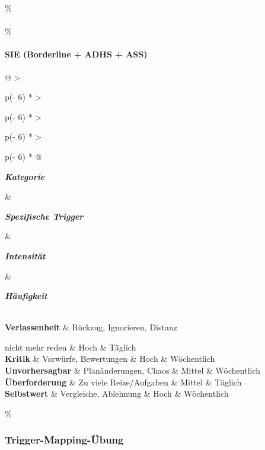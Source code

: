\hypertarget{section}{\%
\paragraph{}\label{section}}

\hypertarget{sie-borderline-adhs-ass}{\%
\paragraph{\texorpdfstring{\textbf{SIE (Borderline + ADHS + ASS)}}{SIE (Borderline + ADHS + ASS)}}\label{sie-borderline-adhs-ass}}

\begin{longtable}[]{@{}
  >{\raggedright\arraybackslash}p{(\columnwidth - 6\tabcolsep) * }
  >{\raggedright\arraybackslash}p{(\columnwidth - 6\tabcolsep) * }
  >{\raggedright\arraybackslash}p{(\columnwidth - 6\tabcolsep) * }
  >{\raggedright\arraybackslash}p{(\columnwidth - 6\tabcolsep) * }@{}}
\toprule\noalign{}
\begin{minipage}[b]{\linewidth}\raggedright
\emph{\textbf{Kategorie}}
\end{minipage} \& \begin{minipage}[b]{\linewidth}\raggedright
\emph{\textbf{Spezifische Trigger}}
\end{minipage} \& \begin{minipage}[b]{\linewidth}\raggedright
\emph{\textbf{Intensität}}
\end{minipage} \& \begin{minipage}[b]{\linewidth}\raggedright
\emph{\textbf{Häufigkeit}}
\end{minipage} \\
\midrule\noalign{}
\endhead
\bottomrule\noalign{}
\endlastfoot
\textbf{Verlassenheit} \& Rückzug, Ignorieren, Distanz

nicht mehr reden \& Hoch \& Täglich \\
\textbf{Kritik} \& Vorwürfe, Bewertungen \& Hoch \& Wöchentlich \\
\textbf{Unvorhersagbar} \& Planänderungen, Chaos \& Mittel \& Wöchentlich \\
\textbf{Überforderung} \& Zu viele Reize/Aufgaben \& Mittel \& Täglich \\
\textbf{Selbstwert} \& Vergleiche, Ablehnung \& Hoch \& Wöchentlich \\
\end{longtable}

\hypertarget{trigger-mapping-uxfcbung}{\%
\subsubsection{\texorpdfstring{\textbf{Trigger-Mapping-Übung}}{Trigger-Mapping-Übung}}\label{trigger-mapping-uxfcbung}}

